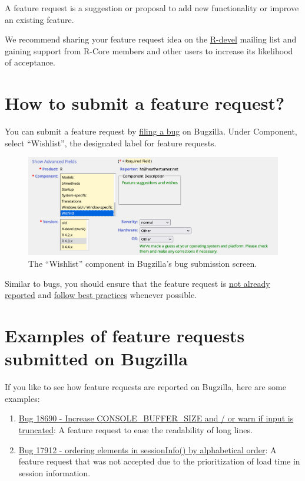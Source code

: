 \documentclass[
]{book}
\providecommand{\tightlist}{%
  \setlength{\itemsep}{0pt}\setlength{\parskip}{0pt}}
\begin{document}
A feature request is a suggestion or proposal to add new functionality or improve an existing feature.

We recommend sharing your feature request idea on the \href{https://stat.ethz.ch/mailman/listinfo/r-devel}{R-devel} mailing list and gaining support from R-Core members and other users to increase its likelihood of acceptance.

\section{How to submit a feature request?}\label{how-to-submit-a-feature-request}

You can submit a feature request by \href{https://bugs.r-project.org/enter_bug.cgi}{filing a bug} on Bugzilla. Under Component, select ``Wishlist'', the designated label for feature requests.

\begin{figure}
\centering
\includegraphics{img/feature-requests.png}
\caption{The ``Wishlist'' component in Bugzilla's bug submission screen.}
\end{figure}

Similar to bugs, you should ensure that the feature request is \hyperref[already-reported-bugs]{not already reported} and \hyperref[good-practices-bugs]{follow best practices} whenever possible.

\section{Examples of feature requests submitted on Bugzilla}\label{examples-of-feature-requests-submitted-on-bugzilla}

If you like to see how feature requests are reported on Bugzilla, here are some examples:

\begin{enumerate}
\def\labelenumi{\arabic{enumi}.}
\tightlist
\item
  \href{https://bugs.r-project.org/show_bug.cgi?id=18690}{Bug 18690 - Increase CONSOLE\_BUFFER\_SIZE and / or warn if input is truncated}: A feature request to ease the readability of long lines.
\item
  \href{https://bugs.r-project.org/show_bug.cgi?id=17912}{Bug 17912 - ordering elements in sessionInfo() by alphabetical order}: A feature request that was not accepted due to the prioritization of load time in session information.
\end{enumerate}
\end{document}
